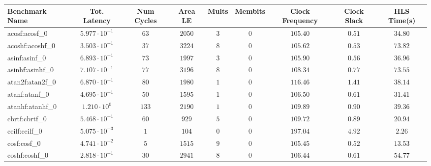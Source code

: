 \begin{tabular}{|l|c|c|c|c|c|c|c|c|}
\hline
Benchmark Name               & Tot. Latency            & Num Cycles & Area LE   & Mults   & Membits    & Clock Frequency & Clock Slack & HLS Time(s) \\
\hline
acosf:acosf\_0               & $ 5.977 \cdot 10^{-1} $ & $ 63     $ & $ 2050  $ & $ 3   $ & $ 0      $ & $ 105.40      $ & $ 0.51    $ & $ 34.80   $ \\
acoshf:acoshf\_0             & $ 3.503 \cdot 10^{-1} $ & $ 37     $ & $ 3224  $ & $ 8   $ & $ 0      $ & $ 105.62      $ & $ 0.53    $ & $ 73.82   $ \\
asinf:asinf\_0               & $ 6.893 \cdot 10^{-1} $ & $ 73     $ & $ 1997  $ & $ 3   $ & $ 0      $ & $ 105.90      $ & $ 0.56    $ & $ 36.96   $ \\
asinhf:asinhf\_0             & $ 7.107 \cdot 10^{-1} $ & $ 77     $ & $ 3196  $ & $ 8   $ & $ 0      $ & $ 108.34      $ & $ 0.77    $ & $ 73.55   $ \\
atan2f:atan2f\_0             & $ 6.870 \cdot 10^{-1} $ & $ 80     $ & $ 1980  $ & $ 1   $ & $ 0      $ & $ 116.46      $ & $ 1.41    $ & $ 38.14   $ \\
atanf:atanf\_0               & $ 4.695 \cdot 10^{-1} $ & $ 50     $ & $ 1595  $ & $ 1   $ & $ 0      $ & $ 106.50      $ & $ 0.61    $ & $ 31.41   $ \\
atanhf:atanhf\_0             & $ 1.210 \cdot 10^{0}  $ & $ 133    $ & $ 2190  $ & $ 1   $ & $ 0      $ & $ 109.89      $ & $ 0.90    $ & $ 39.36   $ \\
cbrtf:cbrtf\_0               & $ 5.468 \cdot 10^{-1} $ & $ 60     $ & $ 929   $ & $ 5   $ & $ 0      $ & $ 109.72      $ & $ 0.89    $ & $ 20.94   $ \\
ceilf:ceilf\_0               & $ 5.075 \cdot 10^{-3} $ & $ 1      $ & $ 104   $ & $ 0   $ & $ 0      $ & $ 197.04      $ & $ 4.92    $ & $ 2.26    $ \\
cosf:cosf\_0                 & $ 4.741 \cdot 10^{-2} $ & $ 5      $ & $ 1515  $ & $ 9   $ & $ 0      $ & $ 105.45      $ & $ 0.52    $ & $ 13.53   $ \\
coshf:coshf\_0               & $ 2.818 \cdot 10^{-1} $ & $ 30     $ & $ 2941  $ & $ 8   $ & $ 0      $ & $ 106.44      $ & $ 0.61    $ & $ 54.77   $ \\

\end{tabular}
